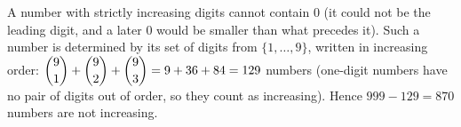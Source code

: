 A number with strictly increasing digits cannot contain $0$ (it could not be the leading digit, and a later $0$ would be smaller than what precedes it). Such a number is determined by its set of digits from $\{1,\dots,9\}$, written in increasing order: $\dbinom91+\dbinom92+\dbinom93=9+36+84=129$ numbers (one-digit numbers have no pair of digits out of order, so they count as increasing). Hence $999-129=\boxed{870}$ numbers are not increasing.
